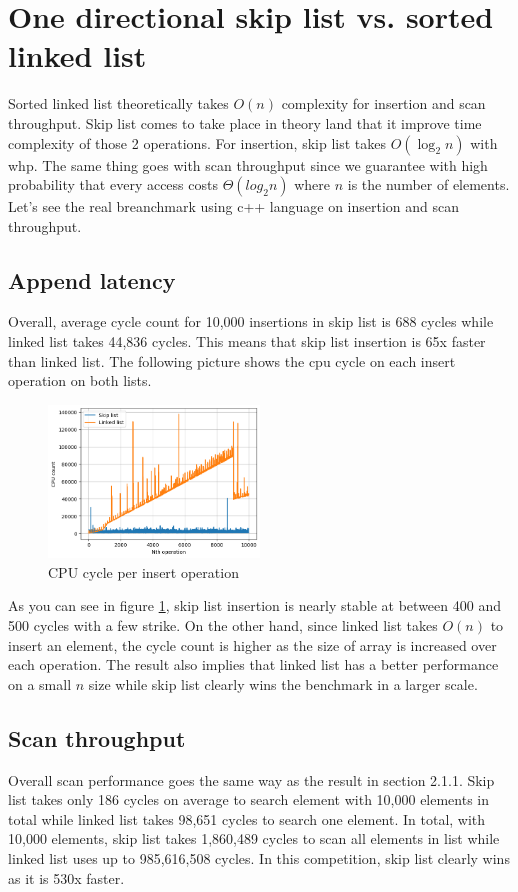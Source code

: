 \documentclass[a4paper, 12pt]{report}
\begin{document}
\section{One directional skip list vs. sorted linked list}

Sorted linked list theoretically takes $O(n)$ complexity for insertion and scan throughput. 
Skip list comes to take place in theory land that it improve time complexity of those 2 operations.
For insertion, skip list takes $O(\log_2 n)$ with whp. The same thing goes with scan throughput since
we guarantee with high probability that every access costs $\Theta(log_2 n)$ where $n$ is the number of elements.
Let's see the real breanchmark using c++ language on insertion and scan throughput.


\subsection{Append latency}
Overall, average cycle count for 10,000 insertions in skip list is 688 cycles while 
linked list takes 44,836 cycles. This means that skip list insertion is 65x faster than linked list.
The following picture shows the cpu cycle on each insert operation on both lists.

\begin{figure}[h]
        \centering
        \includegraphics[width=0.5\textwidth,scale=0.5]{skip_list_insert.png}
        \caption{\label{fig:skip_list_insert} CPU cycle per insert operation}
\end{figure}

As you can see in figure \ref{fig:skip_list_insert}, skip list insertion is nearly stable at between 400 and 500 cycles with a few strike.
On the other hand, since linked list takes $O(n)$ to insert an element, the cycle count is higher as the size of array is increased over each operation.
The result also implies that linked list has a better performance on a small $n$ size while skip list clearly wins the benchmark in a larger scale.

\subsection{Scan throughput}
Overall scan performance goes the same way as the result in section 2.1.1. Skip list takes only 186 cycles on average to search element with 10,000 elements in total
while linked list takes 98,651 cycles to search one element. In total, with 10,000 elements, skip list takes 1,860,489 cycles to scan all elements in list while linked list
uses up to 985,616,508 cycles. In this competition, skip list clearly wins as it is 530x faster.
\end{document}
